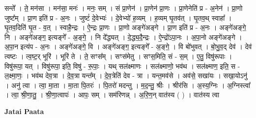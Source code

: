 \documentclass[17pt]{extarticle}
\begin{document}
सन्ते᳚ । ते॒ मन॑सा । मन॑सा॒ मनः॑ । मनः॒ सम् । सं प्रा॒णेन॑ । प्रा॒णेन॑ प्रा॒णः । प्रा॒णेनेति॑ प्र - अ॒नेन॑ । प्रा॒णो जुष्ट᳚म् । प्रा॒ण इति॑ प्र - अ॒नः । जुष्टं॑ दे॒वेभ्यः॑ । दे॒वेभ्यो॑ ह॒व्यम् । ह॒व्यम् घृ॒तव॑त् । घृ॒तव॒थ् स्वाहा᳚ । घृ॒तव॒दिति॑ घृ॒त - व॒त् । स्वाहै॒न्द्रः । ऐ॒न्द्रः प्रा॒णः । प्रा॒णो अङ्गे॑अङ्गे । प्रा॒ण इति॑ प्र - अ॒नः । अङ्गे॑अङ्गे॒ नि । अङ्गे॑अङ्ग॒ इत्यङ्गे᳚ - अ॒ङ्गे॒ । नि दे᳚द्ध्यत् । दे॒द्ध्य॒दै॒न्द्रः । ऐ॒न्द्रो॑ऽपा॒नः । अ॒पा॒नो अङ्गे॑अङ्गे । अ॒पा॒न इत्य॑प - अ॒नः । अङ्गे॑अङ्गे॒ वि । अङ्गे॑अङ्ग॒ इत्यङ्गे᳚ - अ॒ङ्गे॒ । वि बो॑भुवत् । बो॒भु॒व॒द् देव॑ । देव॑ त्वष्टः । त्व॒ष्ट॒र् भूरि॑ । भूरि॑ ते । ते॒ सꣳस᳚म् । सꣳस॑मेतु । सꣳस॒मिति॒ सं - स॒म् । ए॒तु॒ विषु॑रूपाः । विषु॑रूपा॒ यत् । विषु॑रूपा॒ इति॒ विषु॑ - रू॒पाः॒ । यथ् सल॑क्ष्माणः । सल॑क्ष्माणो॒ भव॑थ । सल॑क्ष्माण॒ इति॒ स - ल॒क्ष्मा॒णः॒ । भव॑थ देव॒त्रा । दे॒व॒त्रा यन्त᳚म् । दे॒व॒त्रेति॑ देव - त्रा । यन्त॒मव॑से । अव॑से॒ सखा॑यः । सखा॒योऽनु॑ । अनु॑ त्वा । त्वा॒ मा॒ता । मा॒ता पि॒तरः॑ । पि॒तरो॑ मदन्तु । म॒द॒न्तु॒ श्रीः । श्रीर॑सि । अ॒स्य॒ग्निः । अ॒ग्निस्त्वा᳚ । त्वा॒ श्री॒णा॒तु॒ । श्री॒णा॒त्वापः॑ । आपः॒ सम् । सम॑रिणन्न् । अ॒रि॒ण॒न् वात॑स्य ( ) । वात॑स्य त्वा \newline

\textbf{Jatai Paata} \newline
\end{document}
